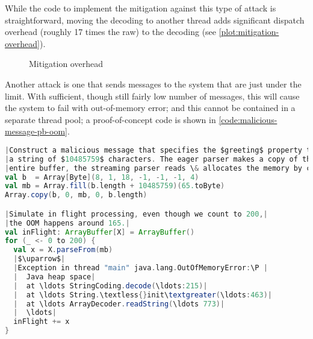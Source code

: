 While the code to implement the mitigation against this type of attack is straightforward, moving the decoding to another thread adds significant dispatch overhead (roughly 17 times the raw) to the decoding (see \autoref{plot:mitigation-overhead}). 

\begin{figure}[h]
  \caption{Mitigation overhead}
  \label{plot:mitigation-overhead}
\end{figure}

Another attack is one that sends messages to the system that are just under the  limit. With sufficient, though still fairly low number of messages, this will cause the system to fail with out-of-memory error; and this cannot be contained in a separate thread pool; a proof-of-concept code is shown in \autoref{code:malicious-message-pb-oom}.

\begin{lstlisting}[caption={Malicious message}, label={code:malicious-message-pb-oom}, language=Scala, escapechar=|]
|Construct a malicious message that specifies the $greeting$ property to be|
|a string of $10485759$ characters. The eager parser makes a copy of the|
|entire buffer, the streaming parser reads \& allocates the memory by chunks.|
val b  = Array[Byte](8, 1, 18, -1, -1, -1, 4)
val mb = Array.fill(b.length + 10485759)(65.toByte)
Array.copy(b, 0, mb, 0, b.length)

|Simulate in flight processing, even though we count to 200,|
|the OOM happens around 165.|
val inFlight: ArrayBuffer[X] = ArrayBuffer()
for (_ <- 0 to 200) {
  val x = X.parseFrom(mb)
  |$\uparrow$|
  |Exception in thread "main" java.lang.OutOfMemoryError:\P |
  |  Java heap space|
  |  at \ldots StringCoding.decode(\ldots:215)|
  |  at \ldots String.\textless{}init\textgreater(\ldots:463)|
  |  at \ldots ArrayDecoder.readString(\ldots 773)|
  |  \ldots|
  inFlight += x
}
\end{lstlisting}

